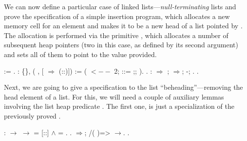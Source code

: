 We can now define a particular case of linked
lists---\textit{null-terminating} lists and prove the specification of a
simple insertion program, which allocates a new memory cell for an
element  and makes it to be a new head of a list pointed by
. The allocation is performed via the primitive , which
allocates a number of subsequent heap pointers (two in this case, as
defined by its second argument) and sets all of them to point to the
value provided.
\begin{coqdoccode}
\coqdocemptyline
\coqdocnoindent
{}   :=   .\coqdoceol
\coqdocemptyline
\coqdocnoindent
{}    : \coqdoceol
\coqdocindent{1.00em}
\{\},  (  , [  \ensuremath{\Rightarrow}   (::)]) :=\coqdoceol
\coqdocindent{1.00em}
 ( $\mathtt{<--}$   2; \coqdoceol
\coqdocindent{3.00em}
 ::= ;;\coqdoceol
\coqdocindent{3.00em}
 ).\coqdoceol
\coqdocnoindent
{} .\coqdoceol
\coqdocnoindent
{}: \ensuremath{\Rightarrow}   \coqdocvar{\_}; \ensuremath{\Rightarrow};   -; .\coqdoceol
\coqdocnoindent
{}.\coqdoceol
\coqdocemptyline
\end{coqdoccode}


Next, we are going to give a specification to the list
``beheading''---removing the head element of a list. For this, we will
need a couple of auxiliary lemmas involving the list heap predicate
. The first one,  is just a specialization of the
previously proved .
\begin{coqdoccode}
\coqdocemptyline
\coqdocnoindent
{}    :   \ensuremath{\rightarrow}      \ensuremath{\rightarrow}  = [::] \ensuremath{\land}  = .\coqdoceol
\coqdocnoindent
{}.  \ensuremath{\Rightarrow}; /( )=>\coqdocvar{\_} \ensuremath{\rightarrow}. .\coqdoceol
\coqdocemptyline
\end{coqdoccode}


